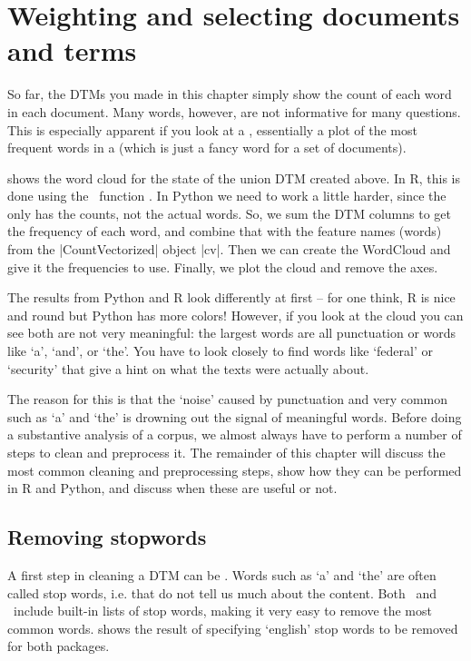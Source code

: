 \section{Weighting and selecting documents and terms}
\label{sec:dtmselect}

So far, the DTMs you made in this chapter simply show the count of each word in each document.
Many words, however, are not informative for many questions.
This is especially apparent if you look at a ,
essentially a plot of the most frequent words in a 
(which is just a fancy word for a set of documents).


 shows the word cloud for the state of the union DTM created above.
In R, this is done using the \quanteda\ function .
In Python we need to work a little harder, since the only has the counts, not the actual words.
So, we sum the DTM columns to get the frequency of each word, and combine that with the feature names (words)
from the |CountVectorized| object |cv|. Then we can create the WordCloud and give it the frequencies to use.
Finally, we plot the cloud and remove the axes.

The results from Python and R look differently at first -- for one think, R is nice and round but Python has more colors!
However, if you look at the cloud you can see both are not very meaningful: the largest words are all punctuation or words like
`a', `and', or `the'.
You have to look closely to find words like `federal' or `security' that give a hint on what the texts were actually about.

The reason for this is that the `noise' caused by punctuation and very common  such as `a' and `the' is drowning out the signal of meaningful words.
Before doing a substantive analysis of a corpus, we almost always have to perform a number of steps to clean and preprocess it.
The remainder of this chapter will discuss the most common cleaning and preprocessing steps,
show how they can be performed in R and Python, and discuss when these are useful or not. 

\subsection{Removing stopwords}

A first step in cleaning a DTM can be .
Words such as `a' and `the' are often called stop words, i.e.  that do not tell us much about the content.
Both \quanteda\ and \sklearn\ include built-in lists of stop words, making it very easy to remove the most common words.
 shows the result of specifying `english' stop words to be removed for both packages.

